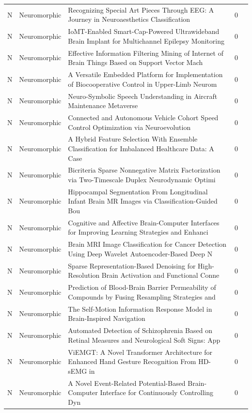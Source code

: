 \documentclass[10pt]{article}
\begin{document}
\begin{longtable}{@{}llL{8.6cm}lL{4.2cm}@{}}
N & Neuromorphic & Recognizing Special Art Pieces Through EEG: A Journey in Neuroaesthetics Classification & 0 &  \\
N & Neuromorphic & IoMT-Enabled Smart-Cap-Powered Ultrawideband Brain Implant for Multichannel Epilepsy Monitoring & 0 &  \\
N & Neuromorphic & Effective Information Filtering Mining of Internet of Brain Things Based on Support Vector Mach & 0 &  \\
N & Neuromorphic & A Versatile Embedded Platform for Implementation of Biocooperative Control in Upper-Limb Neurom & 0 &  \\
N & Neuromorphic & Neuro-Symbolic Speech Understanding in Aircraft Maintenance Metaverse & 0 &  \\
N & Neuromorphic & Connected and Autonomous Vehicle Cohort Speed Control Optimization via Neuroevolution & 0 &  \\
N & Neuromorphic & A Hybrid Feature Selection With Ensemble Classification for Imbalanced Healthcare Data: A Case  & 0 &  \\
N & Neuromorphic & Bicriteria Sparse Nonnegative Matrix Factorization via Two-Timescale Duplex Neurodynamic Optimi & 0 &  \\
N & Neuromorphic & Hippocampal Segmentation From Longitudinal Infant Brain MR Images via Classification-Guided Bou & 0 &  \\
N & Neuromorphic & Cognitive and Affective Brain-Computer Interfaces for Improving Learning Strategies and Enhanci & 0 &  \\
N & Neuromorphic & Brain MRI Image Classification for Cancer Detection Using Deep Wavelet Autoencoder-Based Deep N & 0 &  \\
N & Neuromorphic & Sparse Representation-Based Denoising for High-Resolution Brain Activation and Functional Conne & 0 &  \\
N & Neuromorphic & Prediction of Blood-Brain Barrier Permeability of Compounds by Fusing Resampling Strategies and & 0 &  \\
N & Neuromorphic & The Self-Motion Information Response Model in Brain-Inspired Navigation & 0 &  \\
N & Neuromorphic & Automated Detection of Schizophrenia Based on Retinal Measures and Neurological Soft Signs: App & 0 &  \\
N & Neuromorphic & ViEMGT: A Novel Transformer Architecture for Enhanced Hand Gesture Recognition From HD-sEMG in  & 0 &  \\
N & Neuromorphic & A Novel Event-Related Potential-Based Brain-Computer Interface for Continuously Controlling Dyn & 0 &  \\

\end{longtable}
\end{document}
